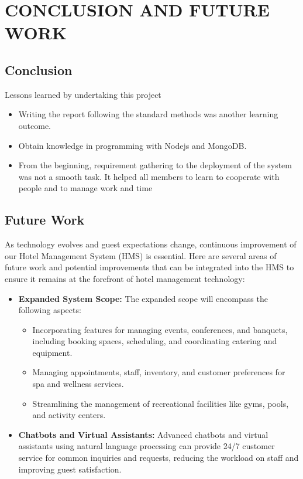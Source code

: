 \chapter{CONCLUSION AND FUTURE WORK}
    \section{Conclusion}
    Lessons learned by undertaking this project
    \begin{itemize}
        \item Writing the report following the standard methods was another learning outcome. 
        \item Obtain knowledge in programming with Nodejs and MongoDB.
        \item From the beginning, requirement gathering to the deployment of the system was not a smooth task. It helped all members to learn to cooperate with people and to manage work and time 
    \end{itemize}
    \section{Future Work}
    As technology evolves and guest expectations change, continuous improvement of our Hotel Management System (HMS) is essential. Here are several areas of future work and potential improvements that can be integrated into the HMS to ensure it remains at the forefront of hotel management technology:
    \begin{itemize}
        \item \textbf{Expanded System Scope:} The expanded scope will encompass the following aspects:
        \begin{itemize}
            \item Incorporating features for managing events, conferences, and banquets, including booking spaces, scheduling, and coordinating catering and equipment.
            \item Managing appointments, staff, inventory, and customer preferences for spa and wellness services.
            \item Streamlining the management of recreational facilities like gyms, pools, and activity centers.
        \end{itemize}
        \item \textbf{Chatbots and Virtual Assistants:} Advanced chatbots and virtual assistants using natural language processing can provide 24/7 customer service for common inquiries and requests, reducing the workload on staff and improving guest satisfaction.
    \end{itemize}
